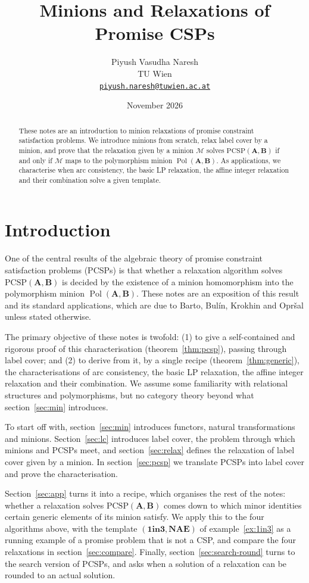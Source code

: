 \documentclass[11pt]{article}
\title{Minions and Relaxations of Promise CSPs}
\author{Piyush Vasudha Naresh\\
TU Wien\\
\href{mailto:piyush.naresh@tuwien.ac.at}{\texttt{piyush.naresh@tuwien.ac.at}}}
\date{November 2026}
\theoremstyle{plain}
\theoremstyle{definition}
\newcommand{\Pol}{\operatorname{Pol}}
\newcommand{\bA}{\mathbf{A}}
\newcommand{\bB}{\mathbf{B}}
\newcommand{\M}{\mathscr{M}}
\newcommand{\OIT}{\mathbf{1in3}}
\newcommand{\NAE}{\mathbf{NAE}}
\newcommand{\PCSP}{\mathrm{PCSP}}
\begin{document}
\maketitle

\begin{abstract}
These notes are an introduction to minion relaxations of promise constraint satisfaction problems. We introduce minions from scratch, relax label cover by a minion, and prove that the relaxation given by a minion $\M$ solves $\PCSP(\bA,\bB)$ if and only if $\M$ maps to the polymorphism minion $\Pol(\bA,\bB)$. As applications, we characterise when arc consistency, the basic LP relaxation, the affine integer relaxation and their combination solve a given template.
\end{abstract}

\section{Introduction}\label{sec:intro}

One of the central results of the algebraic theory of promise constraint satisfaction problems (PCSPs) is that whether a relaxation algorithm solves $\PCSP(\bA,\bB)$ is decided by the existence of a minion homomorphism into the polymorphism minion $\Pol(\bA,\bB)$. These notes are an exposition of this result and its standard applications, which are due to Barto, Bulín, Krokhin and Opršal \cite{BBKO} unless stated otherwise.

The primary objective of these notes is twofold: (1) to give a self-contained and rigorous proof of this characterisation (theorem~\ref{thm:pcsp}), passing through label cover; and (2) to derive from it, by a single recipe (theorem~\ref{thm:generic}), the characterisations of arc consistency, the basic LP relaxation, the affine integer relaxation and their combination. We assume some familiarity with relational structures and polymorphisms, but no category theory beyond what section~\ref{sec:min} introduces.

To start off with, section~\ref{sec:min} introduces functors, natural transformations and minions. Section~\ref{sec:lc} introduces label cover, the problem through which minions and PCSPs meet, and section~\ref{sec:relax} defines the relaxation of label cover given by a minion. In section~\ref{sec:pcsp} we translate PCSPs into label cover and prove the characterisation.

Section~\ref{sec:app} turns it into a recipe, which organises the rest of the notes: whether a relaxation solves $\PCSP(\bA,\bB)$ comes down to which minor identities certain generic elements of its minion satisfy. We apply this to the four algorithms above, with the template $(\OIT,\NAE)$ of example~\ref{ex:1in3} as a running example of a promise problem that is not a CSP, and compare the four relaxations in section~\ref{sec:compare}. Finally, section~\ref{sec:search-round} turns to the search version of PCSPs, and asks when a solution of a relaxation can be rounded to an actual solution.
\end{document}
